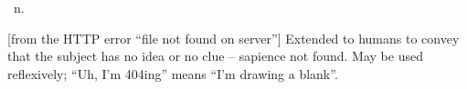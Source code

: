 \ n.

[from the HTTP error ``file not found on server''] Extended to humans to
convey that the subject has no idea or no clue -- sapience not found.
May be used reflexively; ``Uh, I'm 404ing'' means ``I'm drawing a
blank''.

